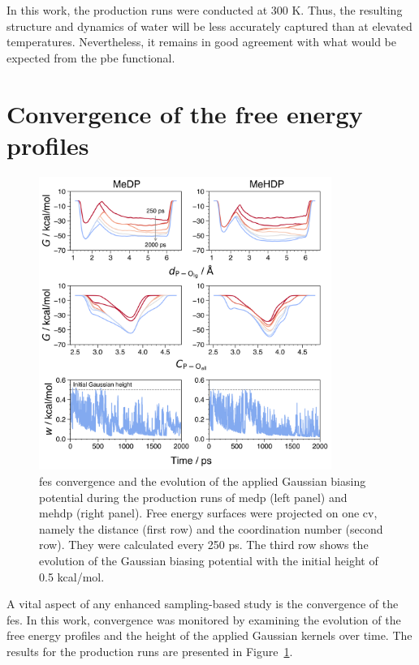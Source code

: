 In this work, the production runs were conducted at 300 K. Thus, the resulting structure and dynamics of water will be less accurately captured than at elevated temperatures. Nevertheless, it remains in good agreement with what would be expected from the \ac{pbe} functional.



\section{Convergence of the free energy profiles}

\begin{figure}[t!]
    \centering
    \includegraphics[width=0.85\textwidth]{Figures/4_Results/results_300K_fes_convergence.png}
    \caption{\ac{fes} convergence and the evolution of the applied Gaussian biasing potential during the production runs of \ac{medp} (left panel) and \ac{mehdp} (right panel). Free energy surfaces were projected on one \ac{cv}, namely the distance (first row) and the coordination number (second row). They were calculated every 250 ps. The third row shows the evolution of the Gaussian biasing potential with the initial height of 0.5 kcal/mol.}
    \label{fig:300k_fes_convergence}
\end{figure}

A vital aspect of any enhanced sampling-based study is the convergence of the \ac{fes}. In this work, convergence was monitored by examining the evolution of the free energy profiles and the height of the applied Gaussian kernels over time. The results for the production runs are presented in Figure~\ref{fig:300k_fes_convergence}.

